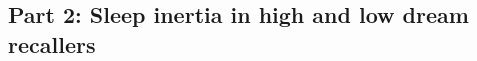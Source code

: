 
\subsection{Part 2: Sleep inertia in high and low dream recallers}
\label{sec:problematic:inertia:drf}

